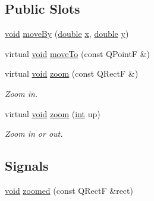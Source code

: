 \subsection*{Public Slots}
\begin{DoxyCompactItemize}
\item 
\hyperlink{group___u_a_v_objects_plugin_ga444cf2ff3f0ecbe028adce838d373f5c}{void} \hyperlink{class_qwt_plot_zoomer_ac66b3eac03db212812198637f4e233ca}{move\-By} (\hyperlink{_super_l_u_support_8h_a8956b2b9f49bf918deed98379d159ca7}{double} \hyperlink{glext_8h_a1db9d104e3c2128177f26aff7b46982f}{x}, \hyperlink{_super_l_u_support_8h_a8956b2b9f49bf918deed98379d159ca7}{double} \hyperlink{glext_8h_a42315f3ed8fff752bb47fd782309fcfc}{y})
\item 
virtual \hyperlink{group___u_a_v_objects_plugin_ga444cf2ff3f0ecbe028adce838d373f5c}{void} \hyperlink{class_qwt_plot_zoomer_a40853271ba53bb66f9cf744ab69c1b13}{move\-To} (const Q\-Point\-F \&)
\item 
virtual \hyperlink{group___u_a_v_objects_plugin_ga444cf2ff3f0ecbe028adce838d373f5c}{void} \hyperlink{class_qwt_plot_zoomer_afe9f123f263536b620d1a9061d5705c6}{zoom} (const Q\-Rect\-F \&)
\begin{DoxyCompactList}\small\item\em Zoom in. \end{DoxyCompactList}\item 
virtual \hyperlink{group___u_a_v_objects_plugin_ga444cf2ff3f0ecbe028adce838d373f5c}{void} \hyperlink{class_qwt_plot_zoomer_a0cee73f15c5791553cb52c4e7b3e881e}{zoom} (\hyperlink{ioapi_8h_a787fa3cf048117ba7123753c1e74fcd6}{int} up)
\begin{DoxyCompactList}\small\item\em Zoom in or out. \end{DoxyCompactList}\end{DoxyCompactItemize}
\subsection*{Signals}
\begin{DoxyCompactItemize}
\item 
\hyperlink{group___u_a_v_objects_plugin_ga444cf2ff3f0ecbe028adce838d373f5c}{void} \hyperlink{class_qwt_plot_zoomer_af5d312de34b493b59e48f03850478648}{zoomed} (const Q\-Rect\-F \&rect)
\end{DoxyCompactItemize}
